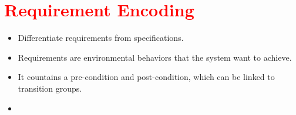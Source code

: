 %

\section{\textcolor{red}{Requirement Encoding}}
\begin{itemize}
	\item Differentiate requirements from specifications.
    \item Requirements are environmental behaviors that the system want to achieve.
    \item It countains a pre-condition and post-condition, which can be linked to transition groups.
    \item 
\end{itemize}
